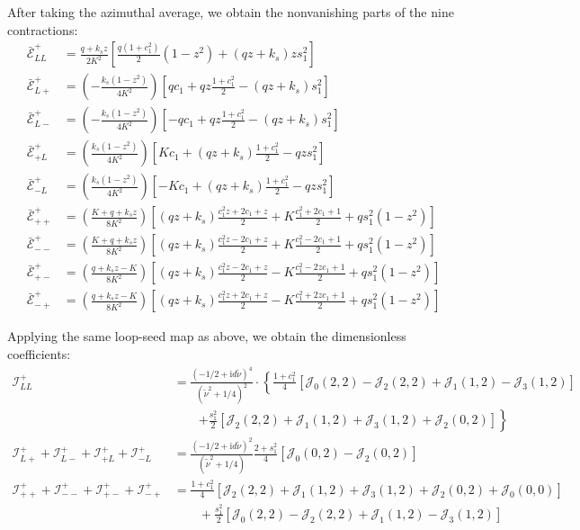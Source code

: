 \documentclass[a4paper,12pt]{article}
\def\J{\mathcal{J}}
\def\ii{\mathrm{i}}
\def\tn{\tilde\nu}
\begin{document}
After taking the azimuthal average, we obtain the nonvanishing parts of the nine contractions:
\begin{align}
    \bar{\mathcal{E}}^+_{LL} 
    &= \frac{q+k_s z}{2K^2}
    \left[
        \frac{q(1+c_1^2)}{2} (1-z^2) 
        + (qz+k_s)z s_1^2
    \right] \nonumber \\
    \bar{\mathcal{E}}^+_{L+}
    &= \left(-\frac{k_s(1-z^2)}{4K^2}\right)
    \left[
        qc_1 + qz\frac{1+c_1^2}{2} -(qz+k_s)s_1^2
    \right] \nonumber \\
    \bar{\mathcal{E}}^+_{L-}
    &= \left(-\frac{k_s(1-z^2)}{4K^2}\right)
    \left[
        -qc_1 + qz\frac{1+c_1^2}{2} -(qz+k_s)s_1^2
    \right] \nonumber \\
    \bar{\mathcal{E}}^+_{+L}
    &= \left(\frac{k_s(1-z^2)}{4K^2}\right)
    \left[
        Kc_1 + (qz+k_s)\frac{1+c_1^2}{2} -qz s_1^2
    \right] \nonumber \\
    \bar{\mathcal{E}}^+_{-L}
    &= \left(\frac{k_s(1-z^2)}{4K^2}\right)
    \left[
        -Kc_1 + (qz+k_s)\frac{1+c_1^2}{2} -qz s_1^2
    \right] \nonumber \\
    \bar{\mathcal{E}}^+_{++}
    &= \left(\frac{K+q+k_sz}{8K^2}\right)
    \left[
        (qz+k_s)\frac{c_1^2z+2c_1+z}{2} +K\frac{c_1^2+2c_1+1}{2} + qs_1^2(1-z^2)
    \right] \nonumber \\
    \bar{\mathcal{E}}^+_{--}
    &= \left(\frac{K+q+k_sz}{8K^2}\right)
    \left[
        (qz+k_s)\frac{c_1^2z-2c_1+z}{2} +K\frac{c_1^2-2c_1+1}{2} + qs_1^2(1-z^2)
    \right] \nonumber \\
    \bar{\mathcal{E}}^+_{+-}
    &= \left(\frac{q+k_sz-K}{8K^2}\right)
    \left[
        (qz+k_s)\frac{c_1^2z-2c_1+z}{2} -K\frac{c_1^2-2zc_1+1}{2} + qs_1^2(1-z^2)
    \right] \nonumber \\
    \bar{\mathcal{E}}^+_{-+}
    &= \left(\frac{q+k_sz-K}{8K^2}\right)
    \left[
        (qz+k_s)\frac{c_1^2z+2c_1+z}{2} -K\frac{c_1^2+2zc_1+1}{2} + qs_1^2(1-z^2)
    \right]
\end{align}

Applying the same loop-seed map as above, we obtain the dimensionless coefficients:
\begin{align}
    {\mathcal{I}}^+_{LL} 
    &= \frac{(-1/2 + \ii d \tn)^4}{(\tn^2+1/4)^2} 
    \cdot \left\{ \frac{1+c_1^2}{4} [ \mathcal{J}_0(2,2) -\mathcal{J}_2(2,2) +\mathcal{J}_1(1,2) -\mathcal{J}_3(1,2) ] \right. \nonumber \\
    &\qquad \left. +\frac{s_1^2}{2} [\mathcal{J}_2(2,2) +\mathcal{J}_1(1,2) +\mathcal{J}_3(1,2) +\mathcal{J}_2(0,2) ] \right\} \nonumber \\
    {\mathcal{I}}^+_{L+} + {\mathcal{I}}^+_{L-} 
    + {\mathcal{I}}^+_{+L} + {\mathcal{I}}^+_{-L} 
    &= \frac{(-1/2 + \ii d \tn)^2}{(\tn^2+1/4)}
    \frac{2+s_1^2}{4} [\mathcal{J}_0(0,2)-\mathcal{J}_2(0,2)] \nonumber \\
    {\mathcal{I}}^+_{++} + {\mathcal{I}}^+_{--} 
    + {\mathcal{I}}^+_{+-} + {\mathcal{I}}^+_{-+} 
    &= \frac{1+c_1^2}{4} [\mathcal{J}_2(2,2) +\mathcal{J}_1(1,2)
    +\J_3(1,2) +\J_2(0,2) +\J_0(0,0)] \nonumber \\
    &\qquad + \frac{s_1^2}{2} [\J_0(2,2) -\J_2(2,2) +\J_1(1,2) -\J_3(1,2)]     
\end{align}
\end{document}
